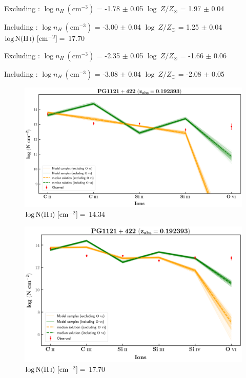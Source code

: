  Excluding  : $\log n_H \ (\text{cm}^{-3})$ = -1.78 $\pm$ 0.05 \hspace{10mm} $\log \ Z/Z_\odot$ = 1.97 $\pm$ 0.04
  
  Including  : $\log n_H \ (\text{cm}^{-3})$ = -3.00 $\pm$ 0.04 \hspace{10mm} $\log \ Z/Z_\odot$ = 1.25 $\pm$ 0.04 \\
  
  $\log \text{N}(\ion{H}{i}) \ [\text{cm}^{-2}]=$  17.70  
  
  Excluding  : $\log n_H \ (\text{cm}^{-3})$ = -2.35 $\pm$ 0.05 \hspace{10mm} $\log \ Z/Z_\odot$ = -1.66 $\pm$ 0.06
  
  Including  : $\log n_H \ (\text{cm}^{-3})$ = -3.08 $\pm$ 0.04 \hspace{10mm} $\log \ Z/Z_\odot$ = -2.08 $\pm$ 0.05 
  
  
  \newpage
  
  \begin{figure}[!h]
      \centering
      \includegraphics[width=0.9\linewidth]{Ionisation-Modelling-Plots/pg1121-z=0.192393-compI_logZ=-1.png}
      \caption{$\log \text{N}(\ion{H}{i}) \ [\text{cm}^{-2}]=$ 14.34}
  \end{figure}
  
  \begin{figure}[!b]
    \centering
    \includegraphics[width=0.9\linewidth]{Ionisation-Modelling-Plots/pg1121-z=0.192393-compII.png}
    \caption{$\log \text{N}(\ion{H}{i}) \ [\text{cm}^{-2}]=$ 17.70}
  \end{figure}
  
